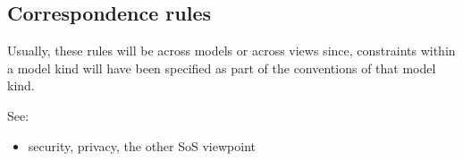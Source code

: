 

\subsection{Correspondence rules}\label{CRs}


Usually, these rules will be across models or across views since,
constraints within a model kind will have been specified as part of
the conventions of that model kind.

See: 

\begin{itemize}
\item security, privacy, the other SoS viewpoint
\end{itemize}


%
%
%
%

%
%

